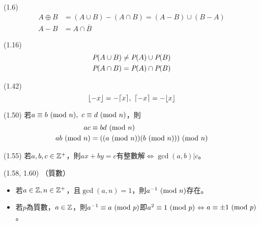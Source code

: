 \item \begin{theorem}{(1.6)} 
    \begin{subequations}
        \begin{align}
            A \oplus B & = (A \cup B) - (A \cap B) = (A - B) \cup (B - A) \\
            A - B & = A \cap \overline{B}
        \end{align}
    \end{subequations}
\end{theorem}

\item \begin{theorem}{(1.16)} \begin{subequations}
    \begin{align}
        \P(A \cup B) & \neq \P(A) \cup \P(B) \\
        \P(A \cap B) & = \P(A) \cap \P(B)
    \end{align}
    \end{subequations}
\end{theorem}

\item \begin{theorem}{(1.42)} \begin{equation}
    \floor*{-x} = - \ceil*{x}, \ \ceil*{-x} = -\floor*{x}
    \end{equation}
\end{theorem}

\item \begin{theorem}{(1.50)} 若$a \equiv b \Mod{n}, \ c \equiv d \Mod{n}$，則
    \begin{subequations}
    \begin{align}
        ac & \equiv bd \Mod{n} \\ 
        ab \Mod{n} & = ((a \Mod{n})(b \Mod{n})) \Mod{n}
    \end{align}
    \end{subequations}
\end{theorem}

\item \begin{theorem}{(1.55)} 若$a, b, c \in \N$，則$ax + by = c$有整數解$\iff$$\gcd(a, b) | c$。
\end{theorem}

\item \begin{theorem}{(1.58, 1.60)} （質數）
    \begin{itemize}
        \item 若$a \in \Z, n \in \N$，且$\gcd(a, n) = 1$，則$a^{-1} \Mod{n}$存在。
        \item 若$p$為質數，$a \in \Z$，則$a^{-1} \equiv a \Mod{p}$即$a^2 \equiv 1 \Mod{p}$$\iff$$a \equiv \pm 1 \Mod{p}$。
    \end{itemize}
\end{theorem}

